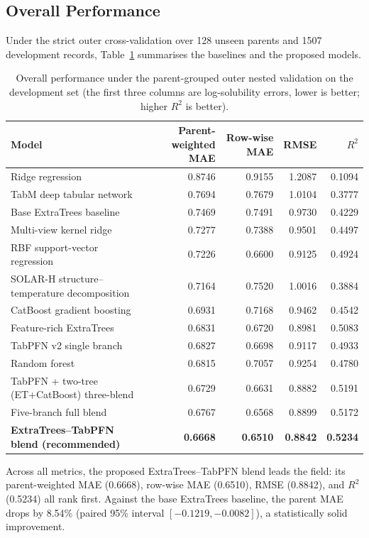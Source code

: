 \subsection{Overall Performance}\label{sec:prediction_results}

Under the strict outer cross-validation over 128 unseen parents and 1507 development records, Table~\ref{tab:v2_main_metrics} summarises the baselines and the proposed models.

\begin{table}[htbp]
\centering
\small
\caption{Overall performance under the parent-grouped outer nested validation on the development set (the first three columns are log-solubility errors, lower is better; higher $R^2$ is better).}
\label{tab:v2_main_metrics}
\begin{tabular}{lrrrr}
\toprule
Model & Parent-weighted MAE & Row-wise MAE & RMSE & $R^2$ \\
\midrule
Ridge regression & 0.8746 & 0.9155 & 1.2087 & 0.1094 \\
TabM deep tabular network & 0.7694 & 0.7679 & 1.0104 & 0.3777 \\
Base ExtraTrees baseline & 0.7469 & 0.7491 & 0.9730 & 0.4229 \\
Multi-view kernel ridge & 0.7277 & 0.7388 & 0.9501 & 0.4497 \\
RBF support-vector regression & 0.7226 & 0.6600 & 0.9125 & 0.4924 \\
SOLAR-H structure--temperature decomposition & 0.7164 & 0.7520 & 1.0016 & 0.3884 \\
CatBoost gradient boosting & 0.6931 & 0.7168 & 0.9462 & 0.4542 \\
Feature-rich ExtraTrees & 0.6831 & 0.6720 & 0.8981 & 0.5083 \\
TabPFN v2 single branch & 0.6827 & 0.6698 & 0.9117 & 0.4933 \\
Random forest & 0.6815 & 0.7057 & 0.9254 & 0.4780 \\
\midrule
TabPFN + two-tree (ET+CatBoost) three-blend & 0.6729 & 0.6631 & 0.8882 & 0.5191 \\
Five-branch full blend & 0.6767 & 0.6568 & 0.8899 & 0.5172 \\
\textbf{ExtraTrees--TabPFN blend (recommended)} & \textbf{0.6668} & \textbf{0.6510} & \textbf{0.8842} & \textbf{0.5234} \\
\bottomrule
\end{tabular}
\end{table}

Across all metrics, the proposed ExtraTrees--TabPFN blend leads the field: its parent-weighted MAE (0.6668), row-wise MAE (0.6510), RMSE (0.8842), and $R^2$ (0.5234) all rank first. Against the base ExtraTrees baseline, the parent MAE drops by 8.54\% (paired 95\% interval $[-0.1219, -0.0082]$), a statistically solid improvement.

